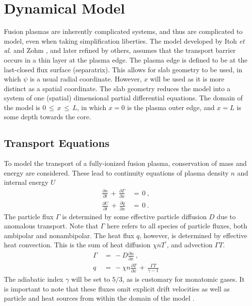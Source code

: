 \chapter{Dynamical Model}\label{chapter:dynamical_model}
Fusion plasmas are inherently complicated systems, and thus are complicated to model, even when taking simplification liberties.
The model developed by Itoh \emph{et al.} \cite{itoh_edge_1991} and Zohm \cite{zohm_dynamic_1994}, and later refined by others, assumes that the transport barrier occurs in a thin layer at the plasma edge.
The plasma edge is defined to be at the last-closed flux surface (separatrix).
This allows for slab geometry to be used, in which $\psi$ is a usual radial coordinate.
However, $x$ will be used as it is more distinct as a spatial coordinate.
The slab geometry reduces the model into a system of one (spatial) dimensional partial differential equations.
The domain of the model is $0 \,\leq\, x \,\leq\, L$, in which $x = 0$ is the plasma outer edge, and $x = L$ is some depth towards the core.

\section{Transport Equations}\label{sec:transport_eqs}
To model the transport of a fully-ionized fusion plasma, conservation of mass and energy are considered.
These lead to continuity equations of plasma density $n$ and internal energy $U$
\begin{align} %
	\frac{\partial n}{\partial t} \,+\, \frac{\partial \Gamma}{\partial x} \,&=\, 0~,\label{eq:n_continuity} \\
	\frac{\partial U}{\partial t} \,+\, \frac{\partial q}{\partial x} \,&=\, 0\label{eq:U_continuity}~.
\end{align}
The particle flux $\Gamma$ is determined by some effective particle diffusion $D$ due to anomalous transport.
Note that $\Gamma$ here refers to all species of particle fluxes, both ambipolar and nonambipolar.
The heat flux $q$, however, is determined by effective heat convection.
This is the sum of heat diffusion $\chi n T^\prime$, and advection $\Gamma T$.
\begin{align} %
	\Gamma \,&=\, -D \frac{\partial n}{\partial x}~,\label{eq:particle_flux} \\
	q \,&=\, -\chi n \frac{\partial T}{\partial x} \,+\, \frac{\Gamma T}{\gamma - 1} \label{eq:heat_flux}
\end{align}
The adiabatic index $\gamma$ will be set to $5/3$, as is customary for monatomic gases.
It is important to note that these fluxes omit explicit drift velocities as well as particle and heat sources from within the domain of the model \cite{zohm_dynamic_1994}.


